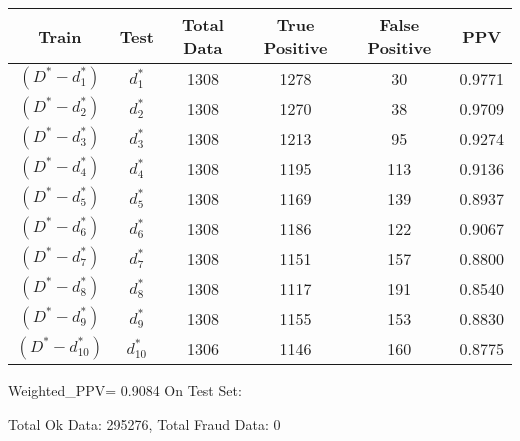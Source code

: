 \begin{table}[h]
\centering
\begin{tabular}{c|c|c|c|c|c|}
Train & Test & Total Data &True Positive &False Positive&PPV \\ 
 \hline
\hline$(D^*-{d_{1}^*})$ & $d_{1}^*$ & 1308 & 1278 & 30 & 0.9771 \\ 
$(D^*-{d_{2}^*})$ & $d_{2}^*$ & 1308 & 1270 & 38 & 0.9709 \\ 
$(D^*-{d_{3}^*})$ & $d_{3}^*$ & 1308 & 1213 & 95 & 0.9274 \\ 
$(D^*-{d_{4}^*})$ & $d_{4}^*$ & 1308 & 1195 & 113 & 0.9136 \\ 
$(D^*-{d_{5}^*})$ & $d_{5}^*$ & 1308 & 1169 & 139 & 0.8937 \\ 
$(D^*-{d_{6}^*})$ & $d_{6}^*$ & 1308 & 1186 & 122 & 0.9067 \\ 
$(D^*-{d_{7}^*})$ & $d_{7}^*$ & 1308 & 1151 & 157 & 0.8800 \\ 
$(D^*-{d_{8}^*})$ & $d_{8}^*$ & 1308 & 1117 & 191 & 0.8540 \\ 
$(D^*-{d_{9}^*})$ & $d_{9}^*$ & 1308 & 1155 & 153 & 0.8830 \\ 
$(D^*-{d_{10}^*})$ & $d_{10}^*$ & 1306 & 1146 & 160 & 0.8775 \\ 
\end{tabular}
\end{table}

Weighted_PPV= 0.9084
On Test Set: \hline 
 
 Total Ok Data: 295276, Total Fraud Data: 0